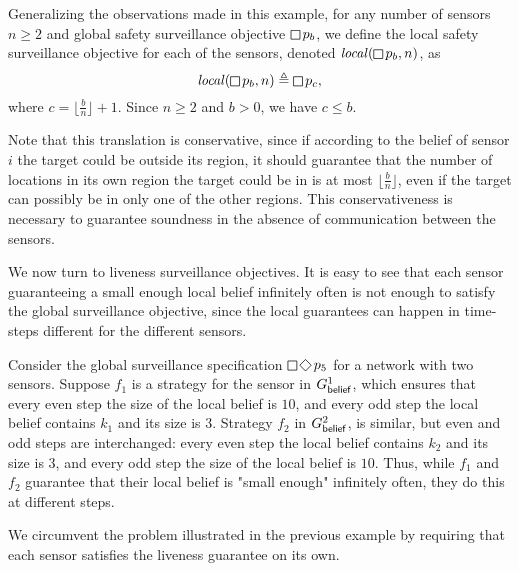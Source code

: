 Generalizing the observations made in this example, for any number of sensors $n \geq 2$ and global safety surveillance objective $\LTLglobally p_b$, we define the local safety surveillance objective for each of the sensors, denoted $\locspec(\LTLglobally p_b,n)$, as \[\locspec(\LTLglobally p_b,n) \triangleq \LTLglobally p_c,\] where $c = \lfloor{\frac{b}{n}}\rfloor+1$. Since $n \geq 2$ and $b >0$, we have $c \leq b$.

Note that this translation is conservative, since if according to the belief of sensor $i$ the target could be outside its region, it should guarantee that the number of locations in its own region the target could be in is at most  $\lfloor{\frac{b}{n}}\rfloor$, even if the target can possibly be in only one of the other regions. This conservativeness is necessary to guarantee soundness in the absence of communication between the sensors.

We now turn to liveness surveillance objectives. It is easy to see that each sensor guaranteeing a small enough local belief infinitely often is not enough to satisfy the global surveillance objective, since the local guarantees can happen in time-steps different for the different sensors.

\begin{example}\label{ex:global-local-liveness}
Consider the global surveillance specification $\LTLglobally\LTLfinally p_5$ for a network with two sensors. Suppose $f_1$ is a strategy for the sensor in $G^1_{\mathsf{belief}}$,  which ensures that every even step the size of the local belief is $10$, and every odd step the local belief contains $k_1$ and its size is $3$. Strategy  $f_2$ in $G^2_{\mathsf{belief}}$,  is similar, but even and odd steps are interchanged: every even step the local belief contains $k_2$ and its size is $3$, and every odd step the size of the local belief is $10$.  Thus, while $f_1$ and $f_2$ guarantee that their local belief is "small enough" infinitely often, they do this at different steps.
\end{example}

We circumvent the problem illustrated in the previous example by requiring that each sensor satisfies the liveness guarantee on its own. 